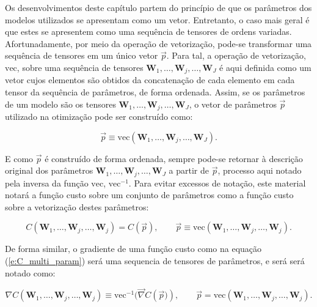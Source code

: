     Os desenvolvimentos deste capítulo partem do princípio de que os parâmetros dos modelos utilizados se apresentam como um vetor. Entretanto, o caso mais geral é que estes se apresentem como uma sequência de tensores de ordens variadas. Afortunadamente, por meio da operação de vetorização, pode-se transformar uma sequência de tensores em um único vetor $\vec{p}$. Para tal, a operação de vetorização, $\text{vec}$, sobre uma sequência de tensores $\boldsymbol{W}_1, \ldots, \boldsymbol{W}_j, \ldots, \boldsymbol{W}_J$ é aqui definida como um vetor cujos elementos são obtidos da concatenação de cada elemento em cada tensor da sequência de parâmetros, de forma ordenada. Assim, se os parâmetros de um modelo são os tensores $\boldsymbol{W}_1, \ldots, \boldsymbol{W}_j, \ldots, \boldsymbol{W}_J$, o vetor de parâmetros $\vec{p}$ utilizado na otimização pode ser construído como:

  \begin{equation}
    \vec{p} \equiv \text{vec}(\boldsymbol{W}_1, \ldots, \boldsymbol{W}_j, \ldots, \boldsymbol{W}_J)
    .
  \end{equation}

  \noindent E como $\vec{p}$ é construído de forma ordenada, sempre pode-se retornar à descrição original dos parâmetros $\boldsymbol{W}_1, \ldots, \boldsymbol{W}_j, \ldots, \boldsymbol{W}_J$ a partir de $\vec{p}$, processo aqui notado pela inversa da função $\text{vec}$, $\text{vec}^{-1}$. Para evitar excessos de notação, este material notará a função custo sobre um conjunto de parâmetros como a função custo sobre a vetorização destes parâmetros:

    \begin{equation} \label{e:C_multi_param}
      C(\boldsymbol{W}_1, \ldots, \boldsymbol{W}_j, \ldots, \boldsymbol{W}_j) =
      C(\vec{p}), \qquad \vec{p} \equiv
      \text{vec}(\boldsymbol{W}_1, \ldots, \boldsymbol{W}_j, \ldots, \boldsymbol{W}_j)
      .
    \end{equation}

    De forma similar, o gradiente de uma função custo como na equação (\ref{e:C_multi_param}) será uma sequencia de tensores de parâmetros, e será será notado como:

    \begin{equation} \label{e:grad_C_multi_param}
      \nabla C(\boldsymbol{W}_1, \ldots, \boldsymbol{W}_j, \ldots, \boldsymbol{W}_j) \equiv
      \text{vec}^{-1}(\vec{\nabla} C\left(\vec{p})\right), \qquad
      \vec{p} = \text{vec}(\boldsymbol{W}_1, \ldots, \boldsymbol{W}_j, \ldots, \boldsymbol{W}_j)
      .
    \end{equation}


